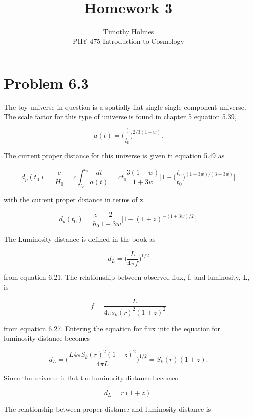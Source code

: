 \documentclass[12pt]{article}
\begin{document}
 
 
\title{Homework 3}
\author{Timothy Holmes\\ %
PHY 475 Introduction to Cosmology}

\maketitle

\section*{Problem 6.3}


The toy universe in question is a spatially flat single single component universe. The scale factor for this type of universe is found in chapter 5 equation 5.39,

$$
a(t) = \Big(\frac{t}{t_{0}}\Big)^{2/3(1 + w)}.
$$

The current proper distance for this universe is given in equation 5.49 as

$$
d_{p}(t_{0}) = \frac{c}{H_{0}} = c \int_{t_{e}}^{t_{0}} \frac{dt}{a(t)} = ct_{0}\frac{3(1 + w)}{1 + 3w}\Big[1 - \Big(\frac{t_{e}}{t_{0}}\big)^{(1 + 3w)/(3 + 3w)} \Big]
$$

with the current proper distance in terms of z 

$$
d_{p}(t_{0}) = \frac{c}{h_{0}}\frac{2}{1 + 3w}\Big[1 - (1 + z)^{-(1 + 3w)/2}\Big].
$$

The Luminosity distance is defined in the book as

$$
d_{L} = \Big(\frac{L}{4\pi f}\Big)^{1/2}
$$

from equation 6.21. The relationship between observed flux, f, and luminosity, L, is

$$
f = \frac{L}{4\pi s_{k}(r)^{2}(1 + z)^{2}}
$$

from equation 6.27. Entering the equation for flux into the equation for luminosity distance becomes

$$
d_{L} = \Big( \frac{L 4\pi S_{k}(r)^{2}(1 + z)^{2}}{4\pi L} \Big)^{1/2} = S_{k}(r)(1 + z).
$$

Since the universe is flat the luminosity distance becomes 

$$
d_{L} = r(1 + z).
$$

The relationship between proper distance and luminosity distance is 
\end{document}
